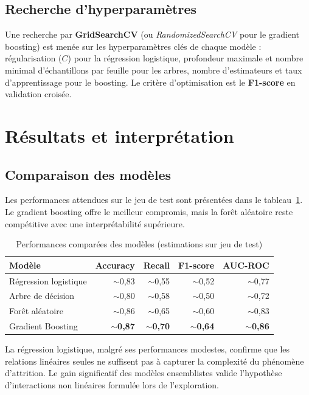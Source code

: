 \subsection{Recherche d'hyperparamètres}

Une recherche par \textbf{GridSearchCV} (ou \textit{RandomizedSearchCV} pour le gradient boosting) est menée sur les hyperparamètres clés de chaque modèle : régularisation ($C$) pour la régression logistique, profondeur maximale et nombre minimal d'échantillons par feuille pour les arbres, nombre d'estimateurs et taux d'apprentissage pour le boosting. Le critère d'optimisation est le \textbf{F1-score} en validation croisée.

\section{Résultats et interprétation}

\subsection{Comparaison des modèles}

Les performances attendues sur le jeu de test sont présentées dans le tableau~\ref{tab:resultats}. Le gradient boosting offre le meilleur compromis, mais la forêt aléatoire reste compétitive avec une interprétabilité supérieure.

\begin{table}[htbp]
\centering
\caption{Performances comparées des modèles (estimations sur jeu de test)}
\label{tab:resultats}
\small
\begin{tabular}{l r r r r}
\toprule
\textbf{Modèle} & \textbf{Accuracy} & \textbf{Recall} & \textbf{F1-score} & \textbf{AUC-ROC} \\
\midrule
Régression logistique & $\sim$0,83 & $\sim$0,55 & $\sim$0,52 & $\sim$0,77 \\
Arbre de décision & $\sim$0,80 & $\sim$0,58 & $\sim$0,50 & $\sim$0,72 \\
Forêt aléatoire & $\sim$0,86 & $\sim$0,65 & $\sim$0,60 & $\sim$0,83 \\
Gradient Boosting & $\sim$\textbf{0,87} & $\sim$\textbf{0,70} & $\sim$\textbf{0,64} & $\sim$\textbf{0,86} \\
\bottomrule
\end{tabular}
\end{table}

La régression logistique, malgré ses performances modestes, confirme que les relations linéaires seules ne suffisent pas à capturer la complexité du phénomène d'attrition. Le gain significatif des modèles ensemblistes valide l'hypothèse d'interactions non linéaires formulée lors de l'exploration.

